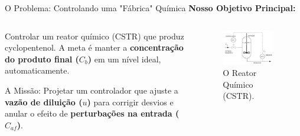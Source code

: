 \documentclass{beamer}
\begin{document}
\begin{frame}{O Problema: Controlando uma "Fábrica" Química}
    \large \textbf{Nosso Objetivo Principal:}
    \vspace{0.5em}
    
    \begin{columns}[T]
        \begin{column}{0.6\textwidth}
            \normalsize
            Controlar um reator químico (CSTR) que produz cyclopentenol. A meta é manter a \textbf{concentração do produto final (\(C_b\))} em um nível ideal, automaticamente.
            
            \vspace{0.5em}
            \alert{A Missão:} Projetar um controlador que ajuste a \textbf{vazão de diluição (\(u\))} para corrigir desvios e anular o efeito de \textbf{perturbações na entrada (\(C_{af}\))}.
        \end{column}
        \begin{column}{0.4\textwidth}
            \begin{figure}
                \includegraphics[width=0.9\textwidth]{Imagens/Reator.png}
                \caption{\tiny O Reator Químico (CSTR).}
            \end{figure}
        \end{column}
    \end{columns}
\end{frame}
\end{document}
